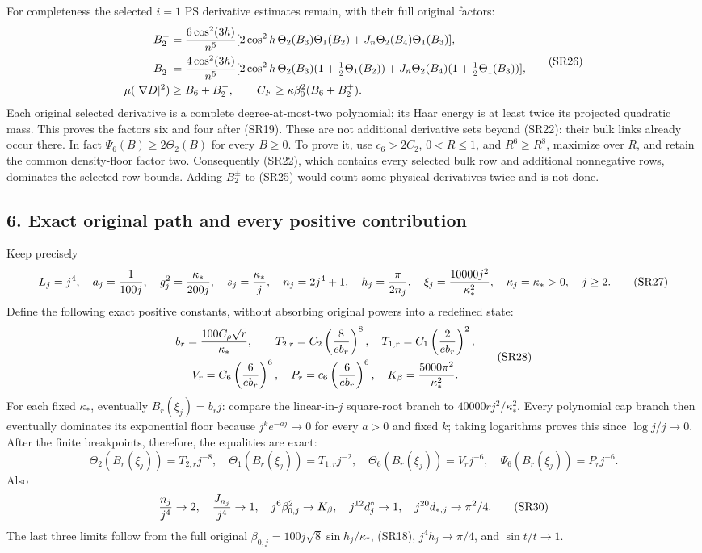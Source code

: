 \documentclass[11pt]{article}
\begin{document}
For completeness the selected \(i=1\) PS derivative estimates remain, with their full original factors:
\[
\begin{aligned}
B_2^-&={6\cos^2(3h)\over n^5}
[2\cos^2h\,\Theta_2(B_3)\Theta_1(B_2)+J_n\Theta_2(B_4)\Theta_1(B_3)],\\
B_2^+&={4\cos^2(3h)\over n^5}
[2\cos^2h\,\Theta_2(B_3)(1+\tfrac12\Theta_1(B_2))
 +J_n\Theta_2(B_4)(1+\tfrac12\Theta_1(B_3))],\\
\mu(|\nabla D|^2)&\ge B_6+B_2^-,\qquad C_F\ge\kappa\beta_0^2(B_6+B_2^+).
\end{aligned}\tag{SR26}
\]
Each original selected derivative is a complete degree-at-most-two polynomial; its Haar energy is at least twice its projected quadratic mass. This proves the factors six and four after (SR19). These are not additional derivative sets beyond (SR22): their bulk links already occur there. In fact \(\Psi_6(B)\ge2\Theta_2(B)\) for every \(B\ge0\). To prove it, use \(c_6>2C_2\), \(0<R\le1\), and \(R^6\ge R^8\), maximize over \(R\), and retain the common density-floor factor two. Consequently (SR22), which contains every selected bulk row and additional nonnegative rows, dominates the selected-row bounds. Adding \(B_2^\pm\) to (SR25) would count some physical derivatives twice and is not done.

\subsection*{6. Exact original path and every positive contribution}

Keep precisely
\[
L_j=j^4,\quad a_j={1\over100j},\quad g_j^2={\kappa_*\over200j},\quad
s_j={\kappa_*\over j},\quad n_j=2j^4+1,\quad h_j={\pi\over2n_j},\quad
\xi_j={10000j^2\over\kappa_*^2},\quad\kappa_j=\kappa_*>0,\quad j\ge2.
\tag{SR27}
\]
Define the following exact positive constants, without absorbing original powers into a redefined state:
\[
\begin{gathered}
b_r={100C_\rho\sqrt r\over\kappa_*},\qquad
T_{2,r}=C_2\left({8\over eb_r}\right)^8,\quad
T_{1,r}=C_1\left({2\over eb_r}\right)^2,\\
V_r=C_6\left({6\over eb_r}\right)^6,\quad
P_r=c_6\left({6\over eb_r}\right)^6,\quad
K_\beta={5000\pi^2\over\kappa_*^2}.
\end{gathered}\tag{SR28}
\]
For each fixed \(\kappa_*\), eventually \(B_r(\xi_j)=b_rj\): compare the linear-in-\(j\) square-root branch to \(40000rj^2/\kappa_*^2\). Every polynomial cap branch then eventually dominates its exponential floor because \(j^k e^{-aj}\to0\) for every \(a>0\) and fixed \(k\); taking logarithms proves this since \(\log j/j\to0\). After the finite breakpoints, therefore, the equalities are exact:
\[
\Theta_2(B_r(\xi_j))=T_{2,r}j^{-8},\quad
\Theta_1(B_r(\xi_j))=T_{1,r}j^{-2},\quad
\Theta_6(B_r(\xi_j))=V_rj^{-6},\quad
\Psi_6(B_r(\xi_j))=P_rj^{-6}.
\tag{SR29}
\]
Also
\[
{n_j\over j^4}\to2,\quad {J_{n_j}\over j^4}\to1,\quad
j^6\beta_{0,j}^2\to K_\beta,\quad
j^{12}d_j^\circ\to1,\quad j^{20}d_{*,j}\to\pi^2/4.
\tag{SR30}
\]
The last three limits follow from the full original \(\beta_{0,j}=100j\sqrt8\sin h_j/\kappa_*\), (SR18), \(j^4h_j\to\pi/4\), and \(\sin t/t\to1\).
\end{document}
